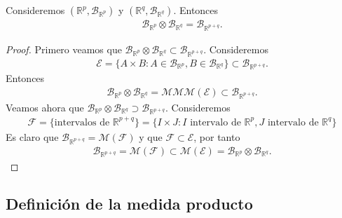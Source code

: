 \begin{prop}
    Consideremos $(\mathbb{R}^p, \mathcal{B}_{\mathbb{R}^p})$ y $(\mathbb{R}^q, \mathcal{B}_{\mathbb{R}^q})$. Entonces
    \begin{align*}
        \mathcal{B}_{\mathbb{R}^p} \otimes \mathcal{B}_{\mathbb{R}^q} = \mathcal{B}_{\mathbb{R}^{p+q}}.
    \end{align*}
\end{prop}

\begin{proof}
    Primero veamos que $\mathcal{B}_{\mathbb{R}^p} \otimes \mathcal{B}_{\mathbb{R}^q} \subset \mathcal{B}_{\mathbb{R}^{p+q}}$. Consideremos
    \begin{align*}
        \mathcal{E} = \{A \times B : A \in \mathcal{B}_{\mathbb{R}^p}, B \in \mathcal{B}_{\mathbb{R}^q} \} \subset \mathcal{B}_{\mathbb{R}^{p+q}}.
    \end{align*}
    Entonces
    \begin{align*}
        \mathcal{B}_{\mathbb{R}^p} \otimes \mathcal{B}_{\mathbb{R}^q} = \mathcal{MMM}(\mathcal{E}) \subset \mathcal{B}_{\mathbb{R}^{p+q}}.
    \end{align*}
    Veamos ahora que  $\mathcal{B}_{\mathbb{R}^p} \otimes \mathcal{B}_{\mathbb{R}^q} \supset \mathcal{B}_{\mathbb{R}^{p+q}}$. Consideremos
    \begin{align*}
        \mathcal{F} = \{ \text{intervalos de } \mathbb{R}^{p+q} \} = \{ I \times J : I \text{ intervalo de } \mathbb{R}^p, J \text{ intervalo de } \mathbb{R}^q\}
    \end{align*}
    Es claro que $\mathcal{B}_{\mathbb{R}^{p+q}} = \mathcal{M}(\mathcal{F})$ y que $\mathcal{F} \subset \mathcal{E}$, por tanto
    \begin{align*}
        \mathcal{B}_{\mathbb{R}^{p+q}} = \mathcal{M}(\mathcal{F}) \subset \mathcal{M}(\mathcal{E}) = \mathcal{B}_{\mathbb{R}^p} \otimes \mathcal{B}_{\mathbb{R}^q}.
    \end{align*}
\end{proof}

\subsection{Definición de la medida producto}

